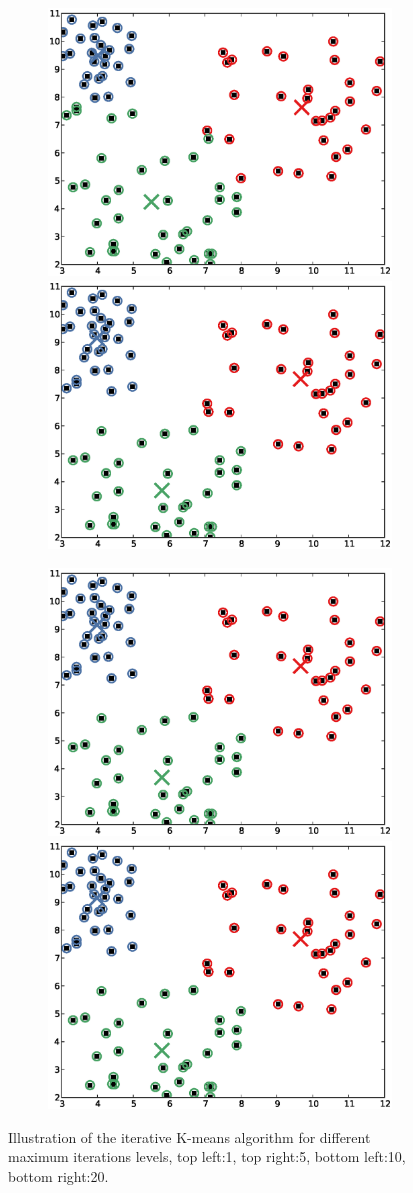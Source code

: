 \documentclass[a4paper,10pt,twoside]{article}
\begin{document}
\begin{figure}
  \begin{subfigure}{1.0\textwidth}
    \centering
    \includegraphics[width=.49\textwidth,height=.3\textheight,keepaspectratio]{figure_1_1.eps}
    \includegraphics[width=.49\textwidth,height=.3\textheight,keepaspectratio]{figure_1_2.eps}
  \end{subfigure}
  \begin{subfigure}{1.0\textwidth}
    \centering
    \includegraphics[width=.49\textwidth,height=.3\textheight,keepaspectratio]{figure_1_3.eps}
    \includegraphics[width=.49\textwidth,height=.3\textheight,keepaspectratio]{figure_1_4.eps}
  \end{subfigure}

  \caption{Illustration of the iterative K-means algorithm for different maximum iterations levels, top left:1, top right:5, bottom left:10, bottom right:20.}
  \label{fig:kmeansiter}
\end{figure}
\end{document}
